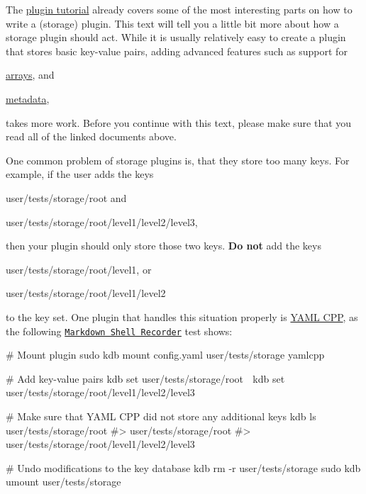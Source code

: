 The \hyperlink{doc_tutorials_plugins_md}{plugin tutorial} already covers some of the most interesting parts on how to write a (storage) plugin. This text will tell you a little bit more about how a storage plugin should act. While it is usually relatively easy to create a plugin that stores basic key-\/value pairs, adding advanced features such as support for


\begin{DoxyItemize}
\item \hyperlink{doc_tutorials_arrays_md}{arrays}, and
\item \hyperlink{doc_dev_metadata_md}{metadata},
\end{DoxyItemize}

takes more work. Before you continue with this text, please make sure that you read all of the linked documents above.

One common problem of storage plugins is, that they store too many keys. For example, if the user adds the keys


\begin{DoxyItemize}
\item {\ttfamily user/tests/storage/root} and
\item {\ttfamily user/tests/storage/root/level1/level2/level3},
\end{DoxyItemize}

then your plugin should only store those two keys. {\bfseries Do not} add the keys


\begin{DoxyItemize}
\item {\ttfamily user/tests/storage/root/level1}, or
\item {\ttfamily user/tests/storage/root/level1/level2}
\end{DoxyItemize}

to the key set. One plugin that handles this situation properly is \hyperlink{autotoc_md865_src_plugins_yamlcpp_README_md}{Y\+A\+ML C\+PP}, as the following \href{https://master.libelektra.org/tests/shell/shell_recorder/tutorial_wrapper}{\tt Markdown Shell Recorder} test shows\+:


\begin{DoxyCode}
# Mount plugin
sudo kdb mount config.yaml user/tests/storage yamlcpp

# Add key-value pairs
kdb set user/tests/storage/root 🐓
kdb set user/tests/storage/root/level1/level2/level3 🐣

# Make sure that YAML CPP did not store any additional keys
kdb ls user/tests/storage/root
#> user/tests/storage/root
#> user/tests/storage/root/level1/level2/level3

# Undo modifications to the key database
kdb rm -r user/tests/storage
sudo kdb umount user/tests/storage
\end{DoxyCode}


